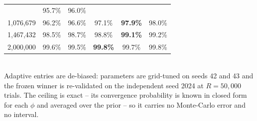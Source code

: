 \begin{table}[ht]
\begin{tabular}{rccccc}
& 95.7\%
& 96.0\% \\
1{,}076{,}679
& 96.2\%
& 96.6\%
& 97.1\%
& \textbf{97.9\%}
& 98.0\% \\
1{,}467{,}432
& 98.5\%
& 98.7\%
& 98.8\%
& \textbf{99.1\%}
& 99.2\% \\
2{,}000{,}000
& 99.6\%
& 99.5\%
& \textbf{99.8\%}
& 99.7\%
& 99.8\% \\
\bottomrule
\end{tabular}
\\[2pt]
\footnotesize Adaptive entries are de-biased: parameters are grid-tuned on seeds 42 and 43 and the frozen winner is re-validated on the independent seed 2024 at $R=50{,}000$ trials. The ceiling is exact -- its convergence probability is known in closed form for each $\phi$ and averaged over the prior -- so it carries no Monte-Carlo error and no interval.
\end{table}
